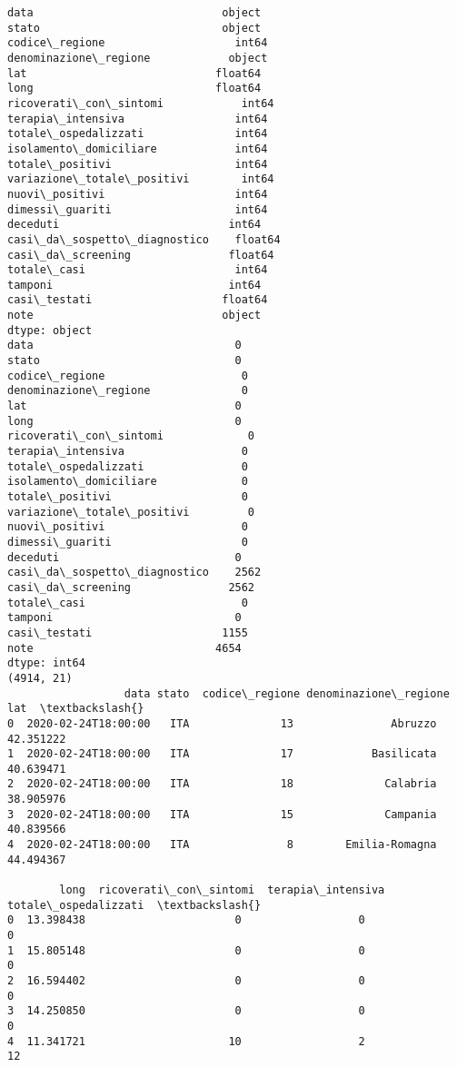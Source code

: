 \documentclass[11pt]{article}
\begin{document}
    \begin{Verbatim}[commandchars=\\\{\}]
data                             object
stato                            object
codice\_regione                    int64
denominazione\_regione            object
lat                             float64
long                            float64
ricoverati\_con\_sintomi            int64
terapia\_intensiva                 int64
totale\_ospedalizzati              int64
isolamento\_domiciliare            int64
totale\_positivi                   int64
variazione\_totale\_positivi        int64
nuovi\_positivi                    int64
dimessi\_guariti                   int64
deceduti                          int64
casi\_da\_sospetto\_diagnostico    float64
casi\_da\_screening               float64
totale\_casi                       int64
tamponi                           int64
casi\_testati                    float64
note                             object
dtype: object
data                               0
stato                              0
codice\_regione                     0
denominazione\_regione              0
lat                                0
long                               0
ricoverati\_con\_sintomi             0
terapia\_intensiva                  0
totale\_ospedalizzati               0
isolamento\_domiciliare             0
totale\_positivi                    0
variazione\_totale\_positivi         0
nuovi\_positivi                     0
dimessi\_guariti                    0
deceduti                           0
casi\_da\_sospetto\_diagnostico    2562
casi\_da\_screening               2562
totale\_casi                        0
tamponi                            0
casi\_testati                    1155
note                            4654
dtype: int64
(4914, 21)
                  data stato  codice\_regione denominazione\_regione        lat  \textbackslash{}
0  2020-02-24T18:00:00   ITA              13               Abruzzo  42.351222
1  2020-02-24T18:00:00   ITA              17            Basilicata  40.639471
2  2020-02-24T18:00:00   ITA              18              Calabria  38.905976
3  2020-02-24T18:00:00   ITA              15              Campania  40.839566
4  2020-02-24T18:00:00   ITA               8        Emilia-Romagna  44.494367

        long  ricoverati\_con\_sintomi  terapia\_intensiva  totale\_ospedalizzati  \textbackslash{}
0  13.398438                       0                  0                     0
1  15.805148                       0                  0                     0
2  16.594402                       0                  0                     0
3  14.250850                       0                  0                     0
4  11.341721                      10                  2                    12


\end{Verbatim}
\end{document}
